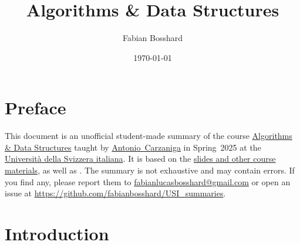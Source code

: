 \usepackage[backend=biber,style=numeric]{biblatex}



\usepackage[
  colorlinks=false,        %
  pdfborder={0 0 0}        %
]{hyperref}
\usepackage[
  type     = {CC},
  modifier = {by},
  version  = {4.0},
]{doclicense}



\title{Algorithms \& Data Structures}
\author{Fabian Bosshard}
\date{\today}







\maketitle
\tableofcontents

\section*{Preface}

This document is an unofficial student-made summary of the course
\href{https://search.usi.ch/en/courses/35270741/algorithms-data-structures}{{Algorithms \& Data Structures}} taught by \href{https://www.inf.usi.ch/carzaniga/}{Antonio~Carzaniga} in Spring~2025 at the \href{https://www.usi.ch/en}{Università della Svizzera italiana}.
It is based on the \href{https://www.inf.usi.ch/carzaniga/edu/algo24s/index.html}{slides and other course materials}, as well as \cite{clrs2022}.
The summary is not exhaustive and may contain errors.
If you find any, please report them to \href{mailto:fabianlucasbosshard@gmail.com}{fabianlucasbosshard@gmail.com} or open an issue at \url{https://github.com/fabianbosshard/USI_summaries}.

\doclicenseThis

\renewcommand{\emph}[1]{\textcolor{black}{#1}}
\printbibliography[heading=bibintoc,title={References}]
\renewcommand{\emph}[1]{\textcolor{mypurple}{#1}}



\section{Introduction}

